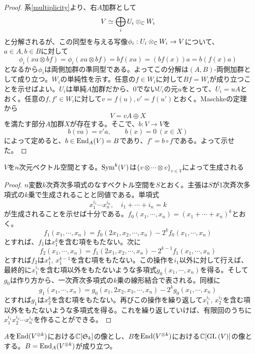 \documentclass{ltjsreport}
\begin{document}
\begin{proof}
  系\ref{multiplicity}より、右$A$加群として
  \[
  V\simeq \bigoplus_iU_i\otimes_{\mathbb{C}}W_i  
  \]
  と分解されるが、この同型を与える写像$\phi_i:U_i\otimes_{\mathbb{C}} W_i\rightarrow V$について、$a\in A, b\in B$に対して
  \[
  \phi_i(xa\otimes bf)=\phi_i(xa\otimes bf)=bf(xa)=(bf(x))a=b(f(x)a)  
  \]
  となるから$\phi_i$は両側加群の準同型である。よってこの分解は$(A,B)$-両側加群として成り立つ。$W_i$の単純性を示す。任意の$f\in W_i$に対して$Bf=W_i$が成り立つことを示せばよい。$U_i$は単純$A$加群だから、$0$でない$U_i$の元$u$をとって、$U_i=uA$とおく。任意の$f,f'\in W_i$に対して$v=f(u), v'=f(u')$とおく。Maschkeの定理から
  \[
  V=vA\oplus X  
  \]
  を満たす部分$A$加群$X$が存在する。そこで、$b:V\rightarrow V$を
  \[
  b(va)=v'a,\qquad b(x)=0\:(x\in X)  
  \]
  によって定めると、$b\in\text{End}_A(V)=B$であり、$f'=b\circ f$である。よって示せた。
\end{proof}


\begin{lemm}\label{gen_of_symtensor}
  $V$を$n$次元ベクトル空間とする。$\text{Sym}^k(V)$は$\{v\otimes\cdots\otimes v\}_{v\in V}$によって生成される
\end{lemm}

\begin{proof}
  $n$変数$k$次斉次多項式のなすベクトル空間を$S$とおく。主張は$S$が1次斉次多項式の$k$乗で生成されることと同値である。単項式
  \[
  x_1^{i_1}\cdots x_n^{i_n},\quad i_1+\cdots+i_n=k
  \]
  が生成されることを示せば十分である。$f_0(x_1,\cdots,x_n)=(x_1+\cdots +x_n)^k$とおく。
  \[
  f_1(x_1,\cdots,x_n)=f_0(2x_1,x_2,\cdots,x_n)-2^{k}f_0(x_1,\cdots,x_n)  
  \]
  とすれば、$f_1$は$x_1^k$を含む項をもたない。次に
  \[
  f_2(x_1,\cdots,x_n)=f_1(2x_1,x_2,\cdots,x_n)-2^{k-1}f_1(x_1,\cdots,x_n)  
  \]
  とすれば$f_2$は$x_1^{k}$, $x_1^{k-1}$を含む項をもたない。この操作を$i_1$以外に対して行えば、最終的に$x_1^{i_1}$を含む項以外をもたないような多項式$g_0(x_1,\cdots,x_n)$を得る。そして$g_0$は作り方から、一次斉次多項式の$k$乗の線形結合で表される。同様に
  \[
  g_1(x_1,\cdots,x_n)=g_0(x_1,2x_2,x_3,\cdots,x_n)-2^{k}g_0(x_1,\cdots,x_n)  
  \]
  とすれば$g_1$は$x_2^k$を含む項をもたない。再びこの操作を繰り返して$x_1^{i_1}$, $x_2^{i_2}$を含む項以外をもたないような多項式を得る。これを繰り返していけば、有限回のうちに$x_1^{i_1}x_2^{i_2}\cdots x_n^{i_n}$を作ることができる。
\end{proof}


\begin{lemm}\label{lemma}
  $A$を$\text{End}(V^{\otimes k})$における$\mathbb{C}[\mathfrak{S}_k]$の像とし、$B$を$\text{End}(V^{\otimes k})$における$\mathbb{C}[\text{GL}\:(V)]$の像とする。$B=\text{End}_A(V^{\otimes k})$が成り立つ。
\end{lemm}
\end{document}

